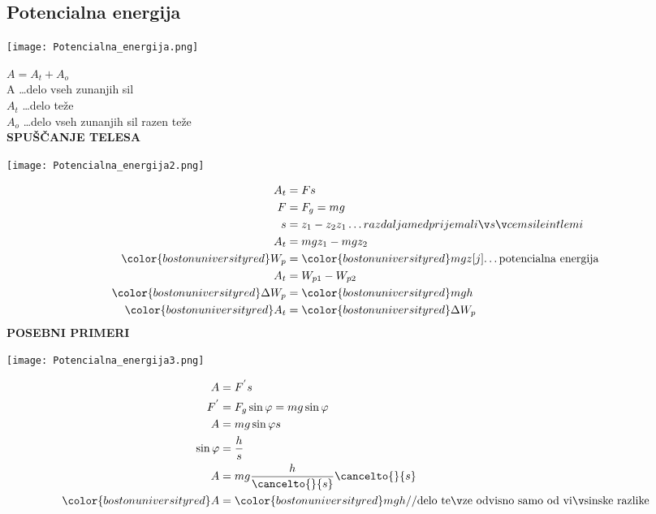 {\color{indiagreen}\subsection{Potencialna energija}}
\begin{center}
	\texttt{[image: Potencialna\_energija.png]}
\end{center}
$A = A_t + A_o$\\
A \dots delo vseh zunanjih sil\\
$A_t$ \dots delo teže\\
$A_o$ \dots delo vseh zunanjih sil razen teže\\
\textbf{SPUŠČANJE TELESA}
\begin{center}
	\texttt{[image: Potencialna\_energija2.png]}
\end{center}
\begin{align*}
	A_t &= Fs\\
	F &= F_g = mg\\
	s &= z_1 - z_2 \text{$z_1 \dots razdalja med prijemališčem sile in tlemi$}\\
	A_t &= mgz_1 - mgz_2\\
	{\color{bostonuniversityred}W_p} &= {\color{bostonuniversityred}mgz[j]} \text{\dots potencialna energija}\\
	A_t &= W_{p1} - W_{p2}\\
	{\color{bostonuniversityred}\Delta W_p} &= {\color{bostonuniversityred}mgh}\\
	{\color{bostonuniversityred}A_t} &= {\color{bostonuniversityred}\Delta W_p}\\
\end{align*}
\textbf{POSEBNI PRIMERI}
\begin{center}
	\texttt{[image: Potencialna\_energija3.png]}
\end{center}
\begin{align*}
	A &= F^{'}s\\
	F^{'} &= F_g \sin\varphi = mg\sin\varphi\\
	A &= mg\sin\varphi s\\
	\sin\varphi &= \frac{h}{s}\\
	A &= mg\frac{h}{\cancelto{}{s}} \cancelto{}{s}\\
	{\color{bostonuniversityred}A} &= {\color{bostonuniversityred}mgh} \text{//delo teže odvisno samo od višinske razlike}\\
\end{align*}
